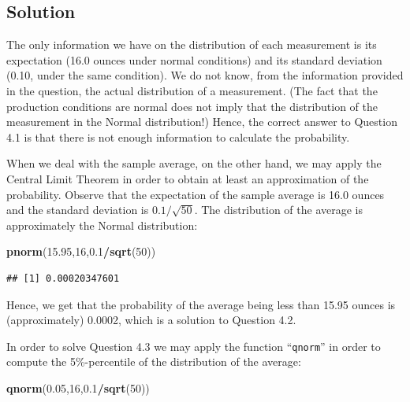 \documentclass[]{krantz}
\makeatletter
\newenvironment{Shaded}{\begin{snugshade}}{\end{snugshade}}
\newcommand{\KeywordTok}[1]{\textcolor[rgb]{0.13,0.29,0.53}{\textbf{#1}}}
\newcommand{\DecValTok}[1]{\textcolor[rgb]{0.00,0.00,0.81}{#1}}
\newcommand{\FloatTok}[1]{\textcolor[rgb]{0.00,0.00,0.81}{#1}}
\newcommand{\OperatorTok}[1]{\textcolor[rgb]{0.81,0.36,0.00}{\textbf{#1}}}
\newcommand{\NormalTok}[1]{#1}
\newenvironment{kframe}{%
\medskip{}
\setlength{\fboxsep}{.8em}
 \def\at@end@of@kframe{}%
 \ifinner\ifhmode%
  \def\at@end@of@kframe{\end{minipage}}%
  \begin{minipage}{\columnwidth}%
 \fi\fi%
 \def\FrameCommand##1{\hskip\@totalleftmargin \hskip-\fboxsep
 \colorbox{shadecolor}{##1}\hskip-\fboxsep
     \hskip-\linewidth \hskip-\@totalleftmargin \hskip\columnwidth}%
 \MakeFramed {\advance\hsize-\width
   \@totalleftmargin\z@ \linewidth\hsize
   \@setminipage}}%
 {\par\unskip\endMakeFramed%
 \at@end@of@kframe}
\renewenvironment{Shaded}{\begin{kframe}}{\end{kframe}}
\theoremstyle{definition}
\theoremstyle{definition}
\theoremstyle{definition}
\theoremstyle{remark}
\makeatother
\begin{document}
\subsection*{Solution}\label{solution-3}


The only information we have on the distribution of each measurement is
its expectation (16.0 ounces under normal conditions) and its standard
deviation (0.10, under the same condition). We do not know, from the
information provided in the question, the actual distribution of a
measurement. (The fact that the production conditions are normal does
not imply that the distribution of the measurement in the Normal
distribution!) Hence, the correct answer to Question 4.1 is that there
is not enough information to calculate the probability.

When we deal with the sample average, on the other hand, we may apply
the Central Limit Theorem in order to obtain at least an approximation
of the probability. Observe that the expectation of the sample average
is 16.0 ounces and the standard deviation is \(0.1/\sqrt{50}\). The
distribution of the average is approximately the Normal distribution:

\begin{Shaded}
\begin{Highlighting}[]
\KeywordTok{pnorm}\NormalTok{(}\FloatTok{15.95}\NormalTok{,}\DecValTok{16}\NormalTok{,}\FloatTok{0.1}\OperatorTok{/}\KeywordTok{sqrt}\NormalTok{(}\DecValTok{50}\NormalTok{))}
\end{Highlighting}
\end{Shaded}

\begin{verbatim}
## [1] 0.00020347601
\end{verbatim}

Hence, we get that the probability of the average being less than 15.95
ounces is (approximately) 0.0002, which is a solution to Question 4.2.

In order to solve Question 4.3 we may apply the function
``\texttt{qnorm}'' in order to compute the 5\%-percentile of the
distribution of the average:

\begin{Shaded}
\begin{Highlighting}[]
\KeywordTok{qnorm}\NormalTok{(}\FloatTok{0.05}\NormalTok{,}\DecValTok{16}\NormalTok{,}\FloatTok{0.1}\OperatorTok{/}\KeywordTok{sqrt}\NormalTok{(}\DecValTok{50}\NormalTok{))}
\end{Highlighting}
\end{Shaded}
\end{document}
